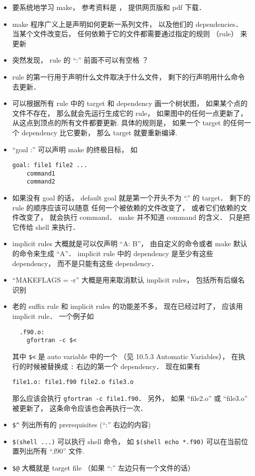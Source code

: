 

\begin{itemize}
\item 要系统地学习 make， 参考资料是 ， 提供网页版和 pdf 下载．
\item make 程序广义上是声明如何更新一系列文件， 以及他们的 dependencies． 当某个文件改变后， 任何依赖于它的文件都需要通过指定的规则 （rule） 来更新
\item 突然发现， rule 的 “:” 前面不可以有空格 ？
\item rule 的第一行用于声明什么文件取决于什么文件， 剩下的行声明用什么命令去更新．
\item 可以根据所有 rule 中的 target 和 dependency 画一个树状图， 如果某个点的文件不存在， 那么就会先运行生成它的 rule， 如果图中的任何一点更新了， 从这点到顶点的所有文件都要更新. 具体的规则是， 如果一个 target 的任何一个 dependency 比它要新， 那么 target 就要重新编译.
\item “goal :” 可以声明 make 的终极目标， 如
\begin{lstlisting}
goal: file1 file2 ...
	command1
	command2
\end{lstlisting}
\item 如果没有 goal 的话， default goal 就是第一个开头不为 “.” 的 target． 剩下的 rule 的顺序应该可以随意
任何一个被依赖的文件改变了， 或者它们依赖的文件改变了， 就会执行 command． make 并不知道 command 的含义． 只是把它传给 shell 来执行．
\item implicit rules 大概就是可以仅声明 “A: B”， 由自定义的命令或者 make 默认的命令来生成 “A”． implicit rule 中的 dependency 是至少有这些 dependency， 而不是只能有这些 dependency．
\item “MAKEFLAGS = -r” 大概是用来取消默认 implicit rules， 包括所有后缀名识别
\item 老的 suffix rule 和 implicit rules 的功能差不多， 现在已经过时了， 应该用 implicit rule． 一个例子如
\begin{lstlisting}
  .f90.o:
	gfortran -c $<
\end{lstlisting}
其中 \lstinline|$<| 是 auto variable 中的一个 （见 10.5.3 Automatic Variables）， 在执行的时候被替换成 \lstinline|:| 右边的第一个 dependency． 现在如果有
\begin{lstlisting}
file1.o: file1.f90 file2.o file3.o
\end{lstlisting}
那么应该会执行 \lstinline|gfortran -c file1.f90|． 另外， 如果 “file2.o” 或 “file3.o” 被更新了， 这条命令应该也会再执行一次．
\item \lstinline|$^| 列出所有的 prerequisites (“:” 右边的内容)
\item \lstinline|$(shell ...)| 可以执行 shell 命令， 如 \lstinline|$(shell echo *.f90)| 可以在当前位置列出所有 “.f90” 文件.
\item \lstinline|$@| 大概就是 target file （如果 “:” 左边只有一个文件的话）
\end{itemize}
